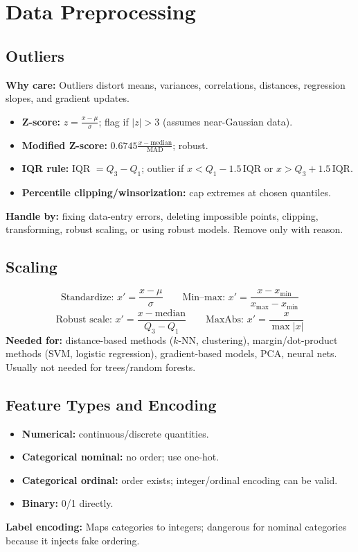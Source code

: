 \documentclass[10pt,twocolumn]{article}
\newcommand{\chead}[1]{\vspace{0.15em}\textbf{#1:} }
\begin{document}
\section{Data Preprocessing}
\subsection{Outliers}
\chead{Why care} Outliers distort means, variances, correlations, distances, regression slopes, and gradient updates.
\begin{itemize}
  \item \textbf{Z-score:} $z=\frac{x-\mu}{\sigma}$; flag if $|z|>3$ (assumes near-Gaussian data).
  \item \textbf{Modified Z-score:} $0.6745\frac{x-\text{median}}{\text{MAD}}$; robust.
  \item \textbf{IQR rule:} IQR $=Q_3-Q_1$; outlier if $x<Q_1-1.5\,\text{IQR}$ or $x>Q_3+1.5\,\text{IQR}$.
  \item \textbf{Percentile clipping/winsorization:} cap extremes at chosen quantiles.
\end{itemize}
\chead{Handle by} fixing data-entry errors, deleting impossible points, clipping, transforming, robust scaling, or using robust models. Remove only with reason.

\subsection{Scaling}
\[
\text{Standardize: }x'=\frac{x-\mu}{\sigma}
\qquad
\text{Min--max: }x'=\frac{x-x_{\min}}{x_{\max}-x_{\min}}
\]
\[
\text{Robust scale: }x'=\frac{x-\text{median}}{Q_3-Q_1}
\qquad
\text{MaxAbs: }x'=\frac{x}{\max|x|}
\]
\chead{Needed for} distance-based methods ($k$-NN, clustering), margin/dot-product methods (SVM, logistic regression), gradient-based models, PCA, neural nets. Usually not needed for trees/random forests.

\subsection{Feature Types and Encoding}
\begin{itemize}
  \item \textbf{Numerical:} continuous/discrete quantities.
  \item \textbf{Categorical nominal:} no order; use one-hot.
  \item \textbf{Categorical ordinal:} order exists; integer/ordinal encoding can be valid.
  \item \textbf{Binary:} 0/1 directly.
\end{itemize}
\chead{Label encoding} Maps categories to integers; dangerous for nominal categories because it injects fake ordering.\
\end{document}
